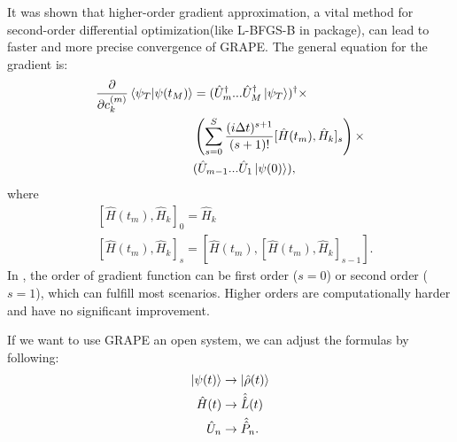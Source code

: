 It was shown that higher-order gradient approximation, a vital method for second-order differential optimization(like L-BFGS-B in package), can lead to faster and more precise convergence of GRAPE. The general equation for the gradient is:
\begin{equation}
    \begin{split}
        \frac{\partial}{\partial c_{k}^{(m)}}\braket{\psi_{T}|\psi(t_{M})}&=(\hat{U}_{m}^{\dagger}...\hat{U}_{M}^{\dagger}\ket{\psi_{T}})^{\dagger}\times\\
        &\left(\sum_{s=0}^{S}\frac{(i\Delta t)^{s+1}}{(s+1)!}[\hat{H}(t_m),\hat{H}_{k}]_s\right)\times\\
        &(\hat{U}_{m-1}...\hat{U}_{1}\ket{\psi(0)}),
    \end{split}
\end{equation}
where
\begin{equation}
    \begin{split}
        &\left[\hat{H}(t_m),\hat{H}_{k}\right]_{0}=\hat{H}_{k}\\
        &\left[\hat{H}(t_m),\hat{H}_{k}\right]_{s}=\left[\hat{H}(t_m),\left[\hat{H}(t_m),\hat{H}_{k}\right]_{s-1}\right].
    \end{split}
\end{equation}
In \MindQuantum, the order of gradient function can be first order ($s=0$) or second order ($s=1$), which can fulfill most scenarios. Higher orders are computationally harder and have no significant improvement.

If we want to use GRAPE an open system, we can adjust the formulas by following:
\begin{equation}
    \begin{split}
        \ket{\psi(t)}&\to \ket{\hat{\rho}(t)}\\
        \hat{H}(t)&\to \hat{\hat{L}}(t)\\
        \hat{U}_{n}&\to \hat{\hat{P}}_{n}.\\
    \end{split}
\end{equation}

